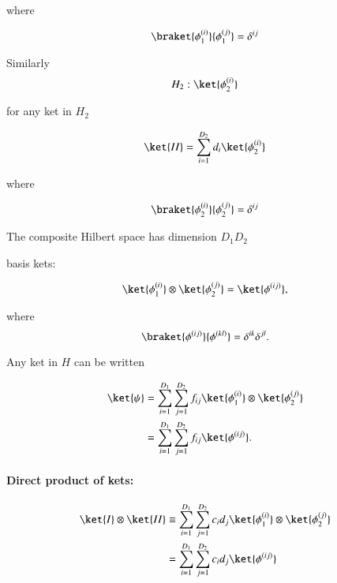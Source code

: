 where

\begin{equation}\label{eqn:qmTwoL1:110}
\braket{ \phi_1^{(i)}}{ \phi_1^{(j)}} = \delta^{i j}
\end{equation}

Similarly
\begin{equation}\label{eqn:qmTwoL1:130}
H_2 : { \ket{\phi_2^{(i)}} }
\end{equation}

for any ket in $H_2$

\begin{equation}\label{eqn:qmTwoL1:150}
\ket{II} = \sum_{i=1}^{D_2} d_i \ket{\phi_2^{(i)}} 
\end{equation}

where

\begin{equation}\label{eqn:qmTwoL1:170}
\braket{ \phi_2^{(i)}}{ \phi_2^{(j)}} = \delta^{i j}
\end{equation}

The composite Hilbert space has dimension $D_1 D_2$

basis kets:

\begin{equation}\label{eqn:qmTwoL1:190}
\ket{ \phi_1^{(i)}} \otimes \ket{ \phi_2^{(j)}}  = \ket{ \phi^{(ij)}},
\end{equation}

where
\begin{equation}\label{eqn:qmTwoL1:210}
\braket{ \phi^{(ij)}}{ \phi^{(kl)}} = \delta^{ik} \delta^{jl}.
\end{equation}

Any ket in $H$ can be written

\begin{align*}
\ket{\psi} 
&= 
\sum_{i = 1}^{D_1}
\sum_{j = 1}^{D_2}
f_{ij}
\ket{ \phi_1^{(i)}} \otimes \ket{ \phi_2^{(j)}}  \\
&= 
\sum_{i = 1}^{D_1}
\sum_{j = 1}^{D_2}
f_{ij}
\ket{ \phi^{(ij)}}.
\end{align*}

\paragraph{Direct product of kets:}

\begin{align*}
\ket{I} \otimes \ket{II} 
&\equiv
\sum_{i = 1}^{D_1}
\sum_{j = 1}^{D_2}
c_i d_j
\ket{ \phi_1^{(i)}} \otimes \ket{ \phi_2^{(j)}} \\
&=
\sum_{i = 1}^{D_1}
\sum_{j = 1}^{D_2}
c_i d_j
\ket{ \phi^{(ij)}} 
\end{align*}

